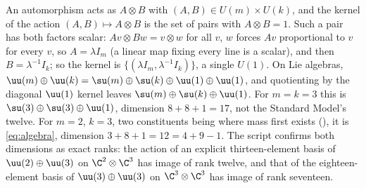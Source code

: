 An automorphism acts as $A \otimes B$ with $(A, B) \in U(m) \times U(k)$, and the kernel of the action $(A, B) \mapsto A \otimes B$ is the set of pairs with $A \otimes B = 1$. Such a pair has both factors scalar: $Av \otimes Bw = v \otimes w$ for all $v$, $w$ forces $Av$ proportional to $v$ for every $v$, so $A = \lambda I_{m}$ (a linear map fixing every line is a scalar), and then $B = \lambda^{-1}I_{k}$; so the kernel is $\{(\lambda I_{m}, \lambda^{-1}I_{k})\}$, a single $U(1)$. On Lie algebras, $\uu(m) \oplus \uu(k) = \su(m) \oplus \su(k) \oplus \uu(1) \oplus \uu(1)$, and quotienting by the diagonal $\uu(1)$ kernel leaves $\su(m) \oplus \su(k) \oplus \uu(1)$. For $m = k = 3$ this is $\su(3) \oplus \su(3) \oplus \uu(1)$, dimension $8 + 8 + 1 = 17$, not the Standard Model's twelve. For $m = 2$, $k = 3$, two constituents being where mass first exists (), it is \eqref{eq:algebra}, dimension $3 + 8 + 1 = 12 = 4 + 9 - 1$. The script confirms both dimensions as exact ranks: the action of an explicit thirteen-element basis of $\uu(2) \oplus \uu(3)$ on $\C^{2} \otimes \C^{3}$ has image of rank twelve, and that of the eighteen-element basis of $\uu(3) \oplus \uu(3)$ on $\C^{3} \otimes \C^{3}$ has image of rank seventeen.
